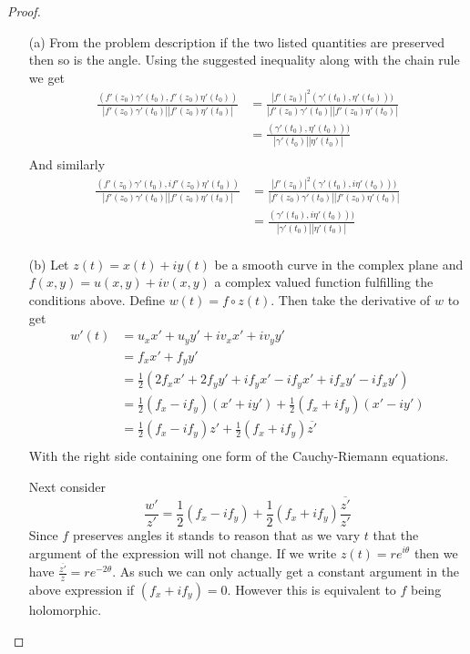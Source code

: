 \documentclass[10pt]{article}
\newcommand{\sk}{\vskip 10mm}
\newcommand{\conj}[1]{\overline{#1}}
\theoremstyle{remark}
\theoremstyle{remark}
\begin{document}
\begin{proof}
  \begin{enumerate}
  \item[(a)] From the problem description if the two listed quantities are
    preserved then so is the angle. Using the suggested inequality along
    with the chain rule we get
    \begin{align*}
      \frac{(f'(z_0)\gamma'(t_0),f'(z_0)\eta'(t_0))}{|f'(z_0)\gamma'(t_0)||f'(z_0)\eta'(t_0)|}&=\frac{|f'(z_0)|^2(\gamma'(t_0),\eta'(t_0)))}{|f'(z_0)\gamma'(t_0)||f'(z_0)\eta'(t_0)|}\\
      &= \frac{(\gamma'(t_0),\eta'(t_0)))}{|\gamma'(t_0)||\eta'(t_0)|}\\
    \end{align*}
    And similarly
    \begin{align*}
      \frac{(f'(z_0)\gamma'(t_0),if'(z_0)\eta'(t_0))}{|f'(z_0)\gamma'(t_0)||f'(z_0)\eta'(t_0)|}&=\frac{|f'(z_0)|^2(\gamma'(t_0),i\eta'(t_0)))}{|f'(z_0)\gamma'(t_0)||f'(z_0)\eta'(t_0)|}\\
      &= \frac{(\gamma'(t_0),i\eta'(t_0)))}{|\gamma'(t_0)||\eta'(t_0)|}\\
    \end{align*}
  \item[(b)] Let $z(t)=x(t)+iy(t)$ be a smooth curve in the complex plane
    and $f(x,y)=u(x,y)+iv(x,y)$ a complex valued function fulfilling the conditions
    above. Define $w(t)=f\circ z(t)$. Then take the derivative of $w$ to get
    \begin{align*}
      w'(t) &= u_x x'+u_y y' + iv_x x'+ iv_y y'\\
            &= f_x x'+f_y y'\\
            &=\frac{1}{2}(2f_x x'+2f_y y'+if_y x'- if_y x'+if_x y'-if_x y')\\
            &=\frac{1}{2}(f_x-if_y)(x'+iy')+\frac{1}{2}(f_x+if_y)(x'-iy')\\
            &=\frac{1}{2}(f_x-if_y)z'+\frac{1}{2}(f_x+if_y)\conj{z'}\\
    \end{align*}
    With the right side containing one form of the Cauchy-Riemann equations.

    Next consider
    \[
      \frac{w'}{z'}=\frac{1}{2}(f_x-if_y)+\frac{1}{2}(f_x+if_y)\frac{\conj{z'}}{z'}
    \]
    Since $f$ preserves angles it stands to reason that as we vary $t$ that
    the argument of the expression will not change. If we write $z(t)=re^{i\theta}$
    then we have $\frac{\conj{z'}}{z}=re^{-2\theta}$. As such we can only actually
    get a constant argument in the above expression if $(f_x+if_y)=0$.
    However this is equivalent to $f$ being holomorphic.
  \end{enumerate}
\end{proof}

\sk

\end{document}
